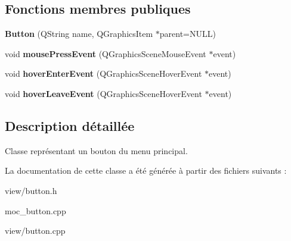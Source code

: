 \subsection*{Fonctions membres publiques}
\begin{DoxyCompactItemize}
\item 
\hypertarget{classButton_a69976e5c00874a3807b642f249c1c776}{{\bfseries Button} (Q\+String name, Q\+Graphics\+Item $\ast$parent=N\+U\+L\+L)}\label{classButton_a69976e5c00874a3807b642f249c1c776}

\item 
\hypertarget{classButton_a17d8eb0c904605b223bbc00c75655315}{void {\bfseries mouse\+Press\+Event} (Q\+Graphics\+Scene\+Mouse\+Event $\ast$event)}\label{classButton_a17d8eb0c904605b223bbc00c75655315}

\item 
\hypertarget{classButton_a633a9684818bc5d300a622a00064f09c}{void {\bfseries hover\+Enter\+Event} (Q\+Graphics\+Scene\+Hover\+Event $\ast$event)}\label{classButton_a633a9684818bc5d300a622a00064f09c}

\item 
\hypertarget{classButton_a1689a97690d9469ce8350d24db0d7485}{void {\bfseries hover\+Leave\+Event} (Q\+Graphics\+Scene\+Hover\+Event $\ast$event)}\label{classButton_a1689a97690d9469ce8350d24db0d7485}

\end{DoxyCompactItemize}


\subsection{Description détaillée}
Classe représentant un bouton du menu principal. 

La documentation de cette classe a été générée à partir des fichiers suivants \+:\begin{DoxyCompactItemize}
\item 
view/button.\+h\item 
moc\+\_\+button.\+cpp\item 
view/button.\+cpp\end{DoxyCompactItemize}
